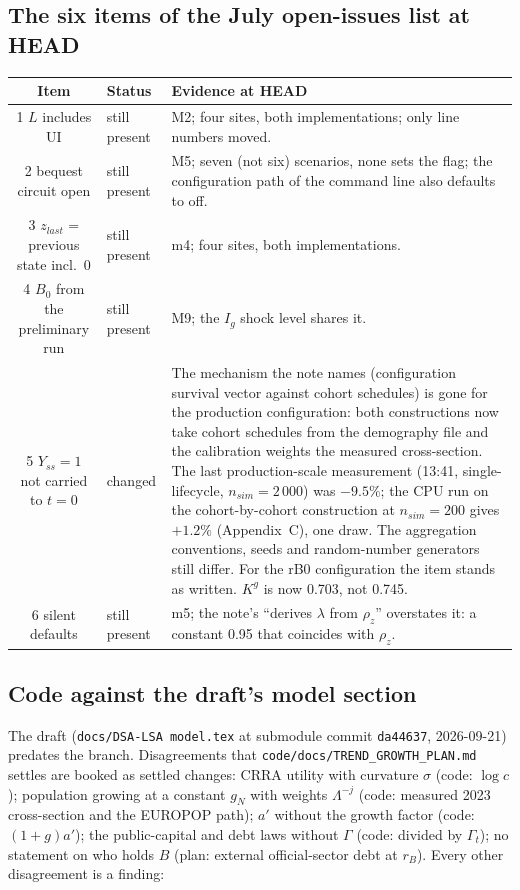\documentclass[11pt,a4paper]{article}
\newcommand{\code}[1]{\texttt{#1}}
\begin{document}
\subsection{The six items of the July open-issues list at HEAD}

\begin{center}\footnotesize
\begin{tabular}{@{}clp{9.6cm}@{}}
\toprule
Item & Status & Evidence at HEAD \\
\midrule
1 $L$ includes UI & still present & M2; four sites, both implementations; only line numbers moved. \\
2 bequest circuit open & still present & M5; seven (not six) scenarios, none sets the flag; the configuration path of the command line also defaults to off. \\
3 $z_{last}$ = previous state incl.\ 0 & still present & m4; four sites, both implementations. \\
4 $B_0$ from the preliminary run & still present & M9; the $I_g$ shock level shares it. \\
5 $Y_{ss} = 1$ not carried to $t = 0$ & changed & The mechanism the note names (configuration survival vector against cohort schedules) is gone for the production configuration: both constructions now take cohort schedules from the demography file and the calibration weights the measured cross-section. The last production-scale measurement (13:41, single-lifecycle, $n_{sim} = 2\,000$) was $-9.5\%$; the CPU run on the cohort-by-cohort construction at $n_{sim} = 200$ gives $+1.2\%$ (Appendix~C), one draw. The aggregation conventions, seeds and random-number generators still differ. For the rB0 configuration the item stands as written. $K^g$ is now 0.703, not 0.745. \\
6 silent defaults & still present & m5; the note's ``derives $\lambda$ from $\rho_z$'' overstates it: a constant 0.95 that coincides with $\rho_z$. \\
\bottomrule
\end{tabular}
\end{center}

\subsection{Code against the draft's model section}

The draft (\code{docs/DSA-LSA model.tex} at submodule commit \code{da44637}, 2026-09-21) predates the branch. Disagreements that \code{code/docs/TREND_GROWTH_PLAN.md} settles are booked as settled changes: CRRA utility with curvature $\sigma$ (code: $\log c$); population growing at a constant $g_N$ with weights $\Lambda^{-j}$ (code: measured 2023 cross-section and the EUROPOP path); $a'$ without the growth factor (code: $(1+g)a'$); the public-capital and debt laws without $\Gamma$ (code: divided by $\Gamma_t$); no statement on who holds $B$ (plan: external official-sector debt at $r_B$). Every other disagreement is a finding:
\end{document}
